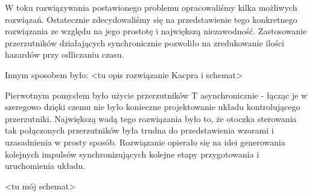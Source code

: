 \documentclass[a4paper]{article}
\begin{document}
W toku rozwiązywania postawionego problemu opracowaliśmy kilka możliwych rozwiązań. Ostatecznie
zdecydowaliśmy się na przedstawienie tego konkretnego rozwiązania ze względu na jego prostotę i 
największą niezawodność. Zastosowanie przerzutników działających synchronicznie pozwoliło na zredukowanie
ilości hazardów przy odliczaniu czasu.

Innym sposobem było: <tu opis rozwiązanie Kacpra i schemat> %

Pierwotnym pomysłem było użycie przerzutników T asynchronicznie - łącząc je w szeregowo dzięki czemu 
nie było konieczne projektowanie układu kontrolującego przerzutniki. Największą wadą tego rozwiązania
było to, że otoczka sterowania tak połączonych przerzutników była trudna do przedstawienia wzorami i 
uzasadnienia w prosty sposób. Rozwiązanie opierało się na idei generowania kolejnych impulsów 
synchronizujących kolejne etapy przygotowania i uruchomienia układu.

<tu mój schemat> %
\end{document}
